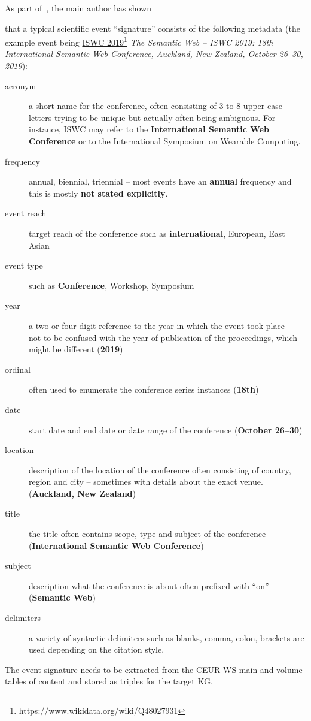 \documentclass[]{ceurart}
\newcommand{\tquote}[1]{``#1''}
\newcommand{\footnotelink}[2]{\href{#1}{#2}\footnote{#1}}
\newif\ifreview\reviewfalse
\begin{document}
\ifreview
In~\cite{Franken2022}, it has been shown
\else
As part of~\cite{Franken2022}, the main author has shown
\fi
that a typical scientific event \tquote{signature} consists of the following metadata (the example event being \footnotelink{https://www.wikidata.org/wiki/Q48027931}{ISWC 2019} \emph{The Semantic Web – ISWC 2019: 18th International Semantic Web Conference, Auckland, New Zealand, October 26–30, 2019}):
\begin{description}
\item[acronym] a short name for the conference, often consisting of 3 to 8 upper case letters trying to be unique but actually often being ambiguous.  For instance, ISWC may refer to the \textbf{International Semantic Web Conference} or to the International Symposium on Wearable Computing.
\item[frequency] annual, biennial, triennial -- most events have an \textbf{annual} frequency and this is mostly \textbf{not stated explicitly}.
\item[event reach] target reach of the conference such as \textbf{international}, European, East Asian
\item[event type] such as \textbf{Conference}, Workshop, Symposium  
\item[year] a two or four digit reference to the year in which the event took place -- not to be confused with the year of publication of the proceedings, which might be different (\textbf{2019})
\item[ordinal] often used to enumerate the conference series instances (\textbf{18th})
\item[date] start date and end date or date range of the conference (\textbf{October 26--30})
\item[location] description of the location of the conference often consisting of country, region and city -- sometimes with details about the exact venue. (\textbf{Auckland, New Zealand})
\item[title] the title often contains scope, type and subject of the conference (\textbf{International Semantic Web Conference})
\item[subject] description what the conference is about often  prefixed with ``on'' (\textbf{Semantic Web})
\item[delimiters] a variety of syntactic delimiters such as blanks, comma, colon, brackets are used depending on the citation style.
\end{description}

The event signature needs to be extracted from the CEUR-WS main and volume tables of content and stored as triples for the target KG. 
\end{document}
